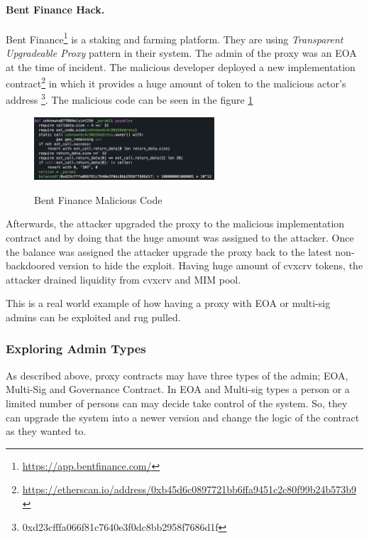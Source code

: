 \paragraph{Bent Finance Hack.}

Bent Finance\footnote{\url{https://app.bentfinance.com/}} is a staking and farming platform. They are using \textit{Transparent Upgradeable Proxy} pattern in their system. The admin of the proxy was an EOA at the time of incident. The malicious developer deployed a new implementation contract\footnote{\url{https://etherscan.io/address/0xb45d6c0897721bb6ffa9451c2c80f99b24b573b9}} in which it provides a huge amount of token to the malicious actor's address \footnote{0xd23cfffa066f81c7640e3f0dc8bb2958f7686d1f}. The malicious code can be seen in the figure \ref{bentFi}

\begin{figure}[t]
  \centering
  \includegraphics[width=0.6\textwidth]{figures/bent.png}\label{bentFi}
  \caption{Bent Finance Malicious Code}
\end{figure}

Afterwards, the attacker upgraded the proxy to the malicious implementation contract and by doing that the huge amount was assigned to the attacker. Once the balance was assigned the attacker upgrade the proxy back to the latest non-backdoored version to hide the exploit. 
Having huge amount of cvxcrv tokens, the attacker drained liquidity from cvxcrv and MIM pool\cite{bentFinanceHack}.

This is a real world example of how having a proxy with EOA or multi-sig admins can be exploited and rug pulled.


\subsubsection{Exploring Admin Types}
As described above, proxy contracts may have three types of the admin; EOA, Multi-Sig and Governance Contract. In EOA and Multi-sig types a person or a limited number of persons can may decide take control of the system. So, they can upgrade the system into a newer version and change the logic of the contract as they wanted to. 

